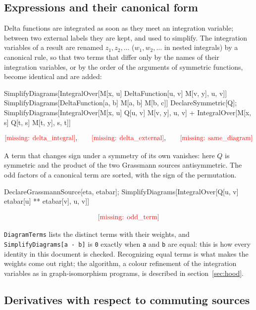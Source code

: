 \documentclass[11pt,a4paper]{article}
\newcommand{\formula}[1]{\IfFileExists{figures/formula_#1.tex}{}{\text{\textcolor{red}{[missing: \detokenize{#1}]}}}}
\newcommand{\pkg}[1]{\texttt{#1}}
\begin{document}
\subsection{Expressions and their canonical form}

Delta functions are integrated as soon as they meet an integration variable; between two external labels they are kept,
and used to simplify. The integration variables of a result are renamed $z_1,z_2,\dots$ ($w_1,w_2,\dots$ in nested
integrals) by a canonical rule, so that two terms that differ only by the names of their integration variables, or by
the order of the arguments of symmetric functions, become identical and are added:
\begin{code}
SimplifyDiagrams[IntegralOver[M[x, u] DeltaFunction[u, v] M[v, y], {u, v}]]
SimplifyDiagrams[DeltaFunction[a, b] M[a, b] M[b, c]]
DeclareSymmetric[Q];
SimplifyDiagrams[IntegralOver[M[x, u] Q[u, v] M[v, y], {u, v}] +
    IntegralOver[M[x, s] Q[t, s] M[t, y], {s, t}]]
\end{code}
\begin{outputbox}
\vspace{-6pt}
\[
\formula{delta_integral},\qquad \formula{delta_external},\qquad \formula{same_diagram}
\]
\end{outputbox}
A term that changes sign under a symmetry of its own vanishes: here $Q$ is symmetric and the product of the two Grassmann
sources antisymmetric. The odd factors of a canonical term are sorted, with the sign of the permutation.
\begin{code}
DeclareGrassmannSource[eta, etabar];
SimplifyDiagrams[IntegralOver[Q[u, v] etabar[u] ** etabar[v], {u, v}]]
\end{code}
\begin{outputbox}
\vspace{-6pt}
\[
\formula{odd_term}
\]
\end{outputbox}
\pkg{DiagramTerms} lists the distinct terms with their weights, and \pkg{SimplifyDiagrams[a - b]} is \pkg{0} exactly when
\pkg{a} and \pkg{b} are equal: this is how every identity in this document is checked. Recognizing equal terms is what
makes the weights come out right; the algorithm, a colour refinement of the integration variables as in
graph-isomorphism programs, is described in section~\ref{sec:hood}.

\subsection{Derivatives with respect to commuting sources}
\end{document}
